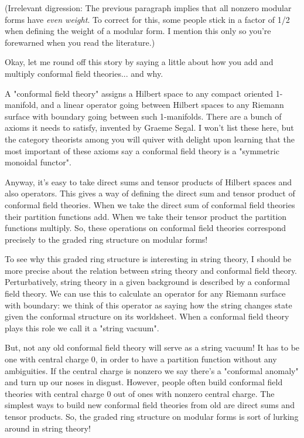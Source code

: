 (Irrelevant digression: The previous paragraph implies that 
all nonzero modular forms have \emph{even weight}.  To correct for
this, some people stick in a factor of 1/2 when defining the 
weight of a modular form.  I mention this only so you're 
forewarned when you read the literature.)
 
Okay, let me round off this story by saying a little about 
how you add and multiply conformal field theories... and why.

A "conformal field theory" assigns a Hilbert space to any 
compact oriented 1-manifold, and a linear operator going
between Hilbert spaces to any Riemann surface with boundary 
going between such 1-manifolds.  There are a bunch of axioms
it needs to satisfy, invented by Graeme Segal.  I won't list 
these here, but the category theorists among you will quiver
with delight upon learning that the most important of these
axioms say a conformal field theory is a "symmetric monoidal 
functor".  

Anyway, it's easy to take direct sums and tensor products of 
Hilbert spaces and also operators.  This gives a way of 
defining the direct sum and tensor product of conformal 
field theories.  When we take the direct sum of conformal 
field theories their partition functions add.  When we take 
their tensor product the partition functions multiply.  So, 
these operations on conformal field theories correspond 
precisely to the graded ring structure on modular forms!

To see why this graded ring structure is interesting in
string theory, I should be more precise about the relation
between string theory and conformal field theory.  Perturbatively, 
string theory in a given background is described by a conformal 
field theory.  We can use this to calculate an operator for 
any Riemann surface with boundary: we think of this operator as
saying how the string changes state given the conformal structure
on its worldsheet.  When a conformal field theory plays this role 
we call it a "string vacuum".   

But, not any old conformal field theory will serve as a string vacuum!
It has to be one with central charge 0, in order to have a partition 
function without any ambiguities.   If the central charge is nonzero
we say there's a "conformal anomaly" and turn up our noses in 
disgust.  However, people often build conformal field theories with central 
charge 0 out of ones with nonzero central charge.  The simplest ways 
to build new conformal field theories from old are direct sums and 
tensor products.  So, the graded ring structure on modular forms is 
sort of lurking around in string theory!


